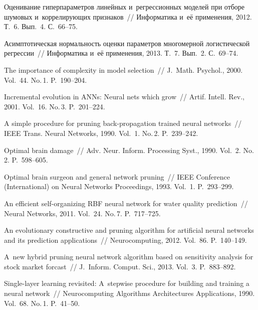 \begin{multicols}{2}
{{\begin{thebibliography}{99}
 Оценивание гиперпараметров линейных
и~регрессионных моделей при отборе шумовых и~коррелирующих признаков~//
Информатика и~её применения, 2012. Т.~6. Вып.~4. С.~66--75.

 Асимптотическая нормальность оценки параметров
многомерной логистической регрессии~// Информатика и~её применения, 2013. Т.~7.
Вып.~2. С.~69--74.

 The importance of complexity in model selection~//
J.~Math. Psychol., 2000. Vol.~44. No.\,1. P.~190--204.

 Incremental evolution in ANNs: Neural
nets which grow~// Artif. Intell. Rev., 2001. Vol.~16. No.\,3. P.~201--224.

 A simple procedure for pruning back-propagation
trained neural networks~// IEEE Trans. Neural Networks, 1990. Vol.~1. No.\,2. P.~239--242.

 Optimal brain damage~//
Adv. Neur. Inform. Processing Syst., 1990. Vol.~2. No.\,2. P.~598--605.

 Optimal brain surgeon and
general network pruning~// IEEE  Conference (International) on Neural Networks
Proceedings, 1993. Vol.~1. P.~293--299.

  An efficient self-organizing {RBF}
neural network for water quality prediction~// Neural Networks, 2011.
Vol.~24. No.\,7. P.~717--725.


 An evolutionary constructive and pruning algorithm
for artificial neural networks and its prediction applications~// Neurocomputing,
2012. Vol.~86. P.~140--149.

 A~new hybrid pruning neural network algorithm based on
sensitivity analysis for stock market forcast~// J.~Inform.
Comput. Sci., 2013. Vol.~3. P.~883--892.


 Single-layer learning revisited:
A~stepwise procedure for building and training a neural network~//
Neurocomputing Algorithms Architectures Applications, 1990.
Vol.~68. No.\,1. P.~41--50.


\end{thebibliography}}}
\end{multicols}

